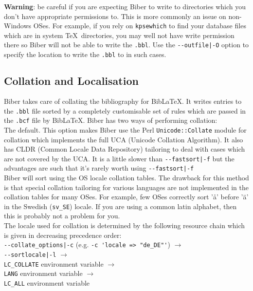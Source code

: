 \documentclass{ltxdockit}
\def\biberex#1{\hbox{\hspace{-4em}\texttt{\small \detokenize{#1}}}}
\begin{document}
\noindent \textbf{Warning}: be careful if you are expecting Biber to
write to directories which you don't have appropriate permissions to. This
is more commonly an issue on non-Windows OSes. For example, if you rely on
\verb+kpsewhich+ to find your database files which are in system \TeX\
directories, you may well not have write permission there so Biber
will not be able to write the \verb+.bbl+. Use the \verb+--outfile|-O+
option to specify the location to write the \verb+.bbl+ to in such cases.

\subsection{Collation and Localisation}\label{coll}

Biber takes care of collating the bibliography for
Bib\LaTeX. It writes entries to the \verb+.bbl+ file sorted by a
completely customisable set of rules which are passed in the
\verb+.bcf+ file by Bib\LaTeX. Biber has two ways of performing
collation:\\[2ex]

\biberex{--collate|-C}
  \noindent The default. This option makes Biber use the Perl
  \verb+Unicode::Collate+ module for collation which implements the full UCA (Unicode
  Collation Algorithm). It also has CLDR (Common Locale Data
  Repository) tailoring to deal with cases which are not covered by the
  UCA. It is a little slower than \verb+--fastsort|-f+ but the
  advantages are such that it's rarely worth using \verb+--fastsort|-f+\\[1ex]

\biberex{--fastsort|-f}
  \noindent Biber will sort using
  the OS locale collation tables. The drawback for this method is that special
  collation tailoring for various languages are not implemented in the
  collation tables for many OSes. For example, few OSes correctly sort 'å'
  before 'ä' in the Swedish (\verb+sv_SE+) locale. If you are using a
  common latin alphabet, then this is probably not a problem for you.\\[2ex]

\noindent The locale used for collation is determined by the following resource
chain which is given in decreasing precedence order:\\[2ex]

\noindent\verb+--collate_options|-c+ (e.g. \verb+-c 'locale => "de_DE"'+) $\rightarrow$\\
\hspace*{1em}\verb+--sortlocale|-l+ $\rightarrow$\\
\hspace*{2em}\verb+LC_COLLATE+ environment variable $\rightarrow$\\
\hspace*{3em}\verb+LANG+ environment variable $\rightarrow$\\
\hspace*{4em}\verb+LC_ALL+ environment variable\\[2ex]
\end{document}
